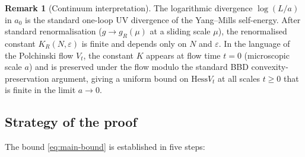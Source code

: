\documentclass[11pt,a4paper]{amsart}
\theoremstyle{definition}
\newtheorem{remark}[theorem]{Remark}
\newcommand{\Hess}{\mathrm{Hess}}
\begin{document}
\begin{remark}[Continuum interpretation]\label{rem:continuum}
The logarithmic divergence $\log(L/a)$ in $a_0$ is the standard one-loop UV
divergence of the Yang--Mills self-energy. After standard renormalisation
($g \to g_R(\mu)$ at a sliding scale $\mu$), the renormalised constant
$K_R(N, \varepsilon)$ is finite and depends only on $N$ and $\varepsilon$.
In the language of the Polchinski flow $V_t$, the constant $K$ appears at
flow time $t = 0$ (microscopic scale $a$) and is preserved under the flow modulo
the standard BBD convexity-preservation argument, giving a uniform bound on
$\Hess V_t$ at all scales $t \geq 0$ that is finite in the limit
$a \to 0$.
\end{remark}

\subsection{Strategy of the proof}

The bound \eqref{eq:main-bound} is established in five steps:
\end{document}
